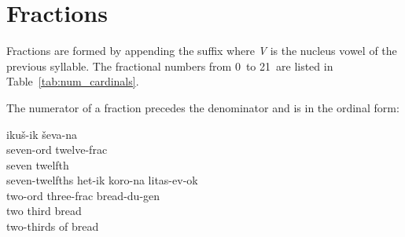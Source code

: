 \documentclass[grammar]{subfiles}
\begin{document}
  \section{Fractions}
  \label{sec:num_fractions}

  Fractions are formed by appending the suffix  where \textit{V} is the nucleus vowel of the previous syllable.  The fractional numbers from 0\dec\ to 21\dec\ are listed in Table~\ref{tab:num_cardinals}.

  \begin{table}[htpb]\small\capstart
      \qquad
      \caption{Fractional numerals from 0\dec\ to 23\dec\label{tab:num_fractional}}
  \end{table}

  \newpage
  The numerator of a fraction precedes the denominator and is in the ordinal form:

  \begin{exe}
    \ex
    \begin{xlist}
      \ex {}
      \glll ikuš-ik ševa-na\\
      seven-\acs{ord} twelve-\acs{frac}\\
      seven twelfth\\
      \glt seven-twelfths
      \ex {}
      \glll het-ik koro-na litas-ev-ok\\
      two-\acs{ord} three-\acs{frac} bread-\acs{du}-\acs{gen}\\
      two third bread\\
      \glt two-thirds of bread
    \end{xlist}
  \end{exe}
\end{document}
